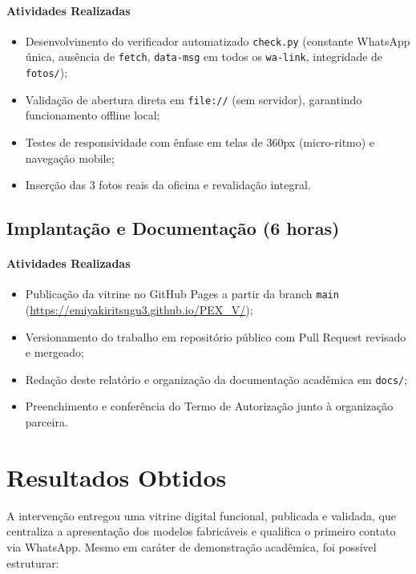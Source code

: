 \documentclass[12pt,a4paper]{article}
\begin{document}
\paragraph{Atividades Realizadas}
\begin{itemize}[leftmargin=*]
\item Desenvolvimento do verificador automatizado \texttt{check.py} (constante WhatsApp única, ausência de \texttt{fetch}, \texttt{data-msg} em todos os \texttt{wa-link}, integridade de \texttt{fotos/});
\item Validação de abertura direta em \texttt{file://} (sem servidor), garantindo funcionamento offline local;
\item Testes de responsividade com ênfase em telas de 360px (micro-ritmo) e navegação mobile;
\item Inserção das 3 fotos reais da oficina e revalidação integral.
\end{itemize}

\subsection{Implantação e Documentação (6 horas)}

\paragraph{Atividades Realizadas}
\begin{itemize}[leftmargin=*]
\item Publicação da vitrine no GitHub Pages \cite{githubpages} a partir da branch \texttt{main} (\url{https://emiyakiritsugu3.github.io/PEX_V/});
\item Versionamento do trabalho em repositório público com Pull Request revisado e mergeado;
\item Redação deste relatório e organização da documentação acadêmica em \texttt{docs/};
\item Preenchimento e conferência do Termo de Autorização junto à organização parceira.
\end{itemize}



\section{Resultados Obtidos}

A intervenção entregou uma vitrine digital funcional, publicada e validada, que centraliza a apresentação dos modelos fabricáveis e qualifica o primeiro contato via WhatsApp. Mesmo em caráter de demonstração acadêmica, foi possível estruturar:
\end{document}
